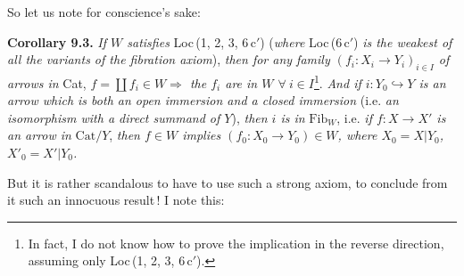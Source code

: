 \documentclass[11pt]{article}
\newcommand{\msp}[1]{\marginpar{\footnotesize [#1]}}
\newcommand{\Cat}{\mathrm{Cat}}
\newcommand{\Fib}{\mathrm{Fib}}
\begin{document}
\msp{page 122}

So let us note for conscience's sake:

\textbf{Corollary 9.3.} \textit{If $W$ satisfies} Loc\,(1, 2, 3, 6\,c$'$) (\textit{where} Loc\,(6\,c$'$) \textit{is the weakest of all the variants of the fibration axiom}), \textit{then for any family $(f_i : X_i\longrightarrow Y_i)_{i\in I}$ of arrows in} Cat, \textit{$f=\coprod f_i\in W\Longrightarrow$ the $f_i$ are in $W$ $\forall\ i\in I$}\footnote[47]{In fact, I do not know how to prove the implication in the reverse direction, assuming only Loc\,(1, 2, 3, 6\,c$'$).}. \textit{And if $i : Y_0\hookrightarrow Y$ is an arrow which is both an open immersion and a closed immersion} (i.e. \textit{an isomorphism with a direct summand of $Y$}), \textit{then $i$ is in} $\Fib_W$, i.e. \textit{if $f : X\longrightarrow X'$ is an arrow in} $\Cat/Y$, \textit{then $f\in W$ implies $(f_0 : X_0\longrightarrow Y_0)\in W$, where $X_0=X|Y_0$, $X'_0=X'|Y_0$.} %

But it is rather scandalous to have to use such a strong axiom, to conclude from it such an innocuous result\,! I note this:
\end{document}
